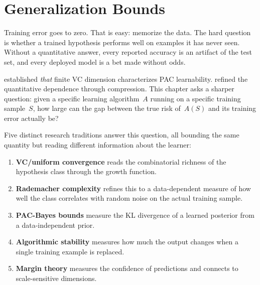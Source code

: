 %

\chapter{Generalization Bounds}
\label{ch:generalization}

Training error goes to zero. That is easy: memorize the data. The hard question is whether a trained hypothesis performs well on examples it has never seen. Without a quantitative answer, every reported accuracy is an artifact of the test set, and every deployed model is a bet made without odds.

 established \emph{that} finite VC dimension characterizes PAC learnability.  refined the quantitative dependence through compression. This chapter asks a sharper question: given a specific learning algorithm~$A$ running on a specific training sample~$S$, how large can the gap between the true risk of~$A(S)$ and its training error actually be?

Five distinct research traditions answer this question, all bounding the same quantity but reading different information about the learner:

\begin{enumerate}[leftmargin=*, itemsep=3pt]
\item \textbf{VC/uniform convergence} reads the combinatorial richness
  of the hypothesis class through the growth function.
\item \textbf{Rademacher complexity} refines this to a data-dependent
  measure of how well the class correlates with random noise on the actual
  training sample.
\item \textbf{PAC-Bayes bounds} measure the KL divergence of a learned
  posterior from a data-independent prior.
\item \textbf{Algorithmic stability} measures how much the output changes
  when a single training example is replaced.
\item \textbf{Margin theory} measures the confidence of predictions
  and connects to scale-sensitive dimensions.
\end{enumerate}

